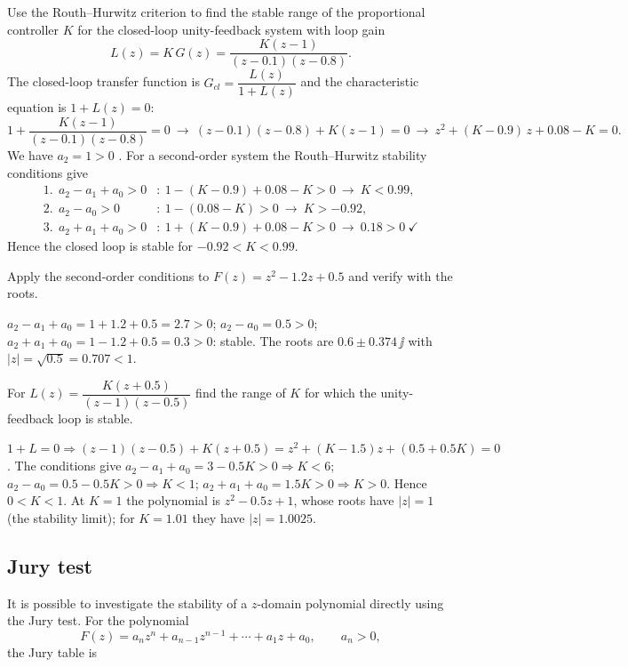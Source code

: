 \begin{example}
Use the Routh--Hurwitz criterion to find the stable range of the proportional controller $K$ for the
closed-loop unity-feedback system with loop gain
\[
  L(z)=K\,G(z)=\frac{K(z-1)}{(z-0.1)(z-0.8)}.
\]
The closed-loop transfer function is $G_{cl}=\dfrac{L(z)}{1+L(z)}$ and the characteristic equation is $1+L(z)=0$:
\[
  1+\frac{K(z-1)}{(z-0.1)(z-0.8)}=0\ \to\ (z-0.1)(z-0.8)+K(z-1)=0\ \to\ z^{2}+(K-0.9)\,z+0.08-K=0.
\]
We have $a_2=1>0$ \checkmark. For a second-order system the Routh--Hurwitz stability conditions give
\begin{align*}
  1.\ \ a_2-a_1+a_0>0&:\ 1-(K-0.9)+0.08-K>0\ \to\ K<0.99,\\
  2.\ \ a_2-a_0>0&:\ 1-(0.08-K)>0\ \to\ K>-0.92,\\
  3.\ \ a_2+a_1+a_0>0&:\ 1+(K-0.9)+0.08-K>0\ \to\ 0.18>0\ \checkmark
\end{align*}
Hence the closed loop is stable for $-0.92<K<0.99$.
\end{example}

\begin{problem}
Apply the second-order conditions to $F(z)=z^{2}-1.2z+0.5$ and verify with the roots.
\end{problem}
\begin{solution}
$a_2-a_1+a_0=1+1.2+0.5=2.7>0$; $a_2-a_0=0.5>0$; $a_2+a_1+a_0=1-1.2+0.5=0.3>0$: stable. The roots are
$0.6\pm0.374\,\jj$ with $|z|=\sqrt{0.5}=0.707<1$.
\end{solution}

\begin{problem}
For $L(z)=\dfrac{K(z+0.5)}{(z-1)(z-0.5)}$ find the range of $K$ for which the unity-feedback loop is stable.
\end{problem}
\begin{solution}
$1+L=0\Rightarrow(z-1)(z-0.5)+K(z+0.5)=z^{2}+(K-1.5)z+(0.5+0.5K)=0$. The conditions give
$a_2-a_1+a_0=3-0.5K>0\Rightarrow K<6$; $a_2-a_0=0.5-0.5K>0\Rightarrow K<1$;
$a_2+a_1+a_0=1.5K>0\Rightarrow K>0$. Hence $0<K<1$. At $K=1$ the polynomial is $z^{2}-0.5z+1$, whose roots
have $|z|=1$ (the stability limit); for $K=1.01$ they have $|z|=1.0025$.
\end{solution}

\subsection{Jury test}
It is possible to investigate the stability of a $z$-domain polynomial directly using the Jury test. For the
polynomial
\[
  F(z)=a_nz^{n}+a_{n-1}z^{n-1}+\cdots+a_1z+a_0,\qquad a_n>0,
\]
the Jury table is

